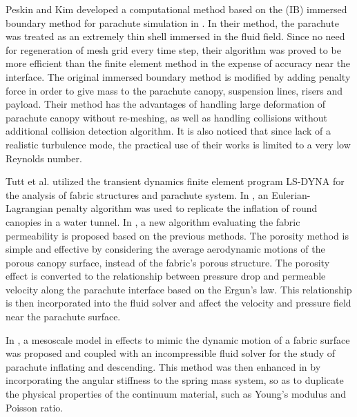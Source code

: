 Peskin and Kim developed a computational method based on the (IB) immersed boundary 
method for parachute simulation in \cite{Kim2006,Kim2009}. In their method, the
parachute was treated as an extremely thin shell immersed in the fluid field. Since no need for regeneration of mesh grid every time step, their algorithm was proved to be
more efficient than the finite element method in the expense of accuracy near
the interface. The original immersed boundary method is modified by adding penalty 
force in order to give mass to the parachute canopy, suspension lines, risers and payload. Their method has the advantages of handling large deformation of parachute canopy without re-meshing, as well as handling collisions without additional collision detection algorithm. It is also noticed that since lack of a realistic turbulence mode, the practical use of their works is limited to a very low Reynolds number. 

Tutt et al. utilized the transient dynamics finite element program LS-DYNA 
for the analysis of fabric structures and parachute system.
In \cite{Tutt2005}, an Eulerian-Lagrangian penalty
algorithm was used to replicate the inflation of round canopies in a water
tunnel. In \cite{Aquelet2007, tutt2006application, wang2006porous}, a new algorithm evaluating the fabric permeability is proposed based on the previous methods. The porosity method is simple and effective by considering the average aerodynamic motions of the porous canopy surface, instead of the fabric's porous
structure. The porosity effect is converted to the relationship 
between pressure drop and permeable velocity along the parachute interface based on the Ergun's law. This relationship is then incorporated into the fluid solver and 
affect the velocity and pressure field near the parachute surface.

In \cite{Kim2013,Li2013}, a mesoscale model
in effects to mimic the dynamic motion of a fabric surface was proposed and
coupled with an incompressible fluid solver for the study of parachute
inflating and descending. This method was then enhanced in \cite{Shi2015} by
incorporating the angular stiffness to the spring mass system, so as to
duplicate the physical properties of the continuum material, such as Young's
modulus and Poisson ratio.

